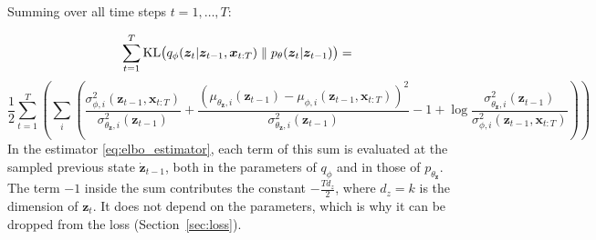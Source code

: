 Summing over all time steps $t = 1, \dots, T$:

\begin{equation*}
\sum_{t=1}^T \mathrm{KL}\big( q_\phi(\bm{z}_t | \bm{z}_{t-1}, 
\bm{x}_{t:T})
\parallel p_\theta(\bm{z}_t | \bm{z}_{t-1}) \big) = 
\end{equation*}
\begin{equation}
    \frac{1}{2} \sum_{t=1}^T \left( 
        \sum_{i} \left( 
            \frac{\sigma^2_{\phi, i}(\bm{z}_{t-1}, \bm{x}_{t:T})}{\sigma^2_{\theta_{\bm{z}}, i}(\bm{z}_{t-1})} 
            + \frac{(\mu_{\theta_{\bm{z}}, i}(\bm{z}_{t-1}) - \mu_{\phi, i}(\bm{z}_{t-1}, \bm{x}_{t:T}))^2}{\sigma^2_{\theta_{\bm{z}}, i}(\bm{z}_{t-1})} 
            - 1 
            + \log \frac{\sigma^2_{\theta_{\bm{z}}, i}(\bm{z}_{t-1})}{\sigma^2_{\phi, i}(\bm{z}_{t-1}, \bm{x}_{t:T})} 
        \right)
    \right)\label{eq:regularization_term}
\end{equation}
\noindent In the estimator \eqref{eq:elbo_estimator}, each term of this sum
is evaluated at the sampled previous state $\dot{\bm{z}}_{t-1}$, both in
the parameters of $q_\phi$ and in those of $p_{\theta_{\bm{z}}}$. The
term $-1$ inside the sum contributes the constant $-\frac{T d_z}{2}$,
where $d_z = k$ is the dimension of $\bm{z}_t$. It does not depend on the
parameters, which is why it can be dropped from the loss
(Section~\ref{sec:loss}).
